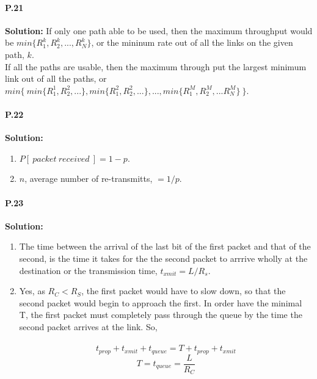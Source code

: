 \documentclass[12pt]{article}
\begin{document}
\paragraph{P.21\\}                                                                                                                                                
\textbf{Solution:}
If only one path able to be used, then the maximum throughput would be $min\{ R^k_1, R^k_2,...,R^k_N\}$, or the mininum rate out of all the links on the given path, $k$.\\If all the paths are usable, then the maximum through put the largest minimum link out of all the paths, or $min\{\ min\{R^1_1, R^2_2,...\}, min\{R^2_1, R^2_2,...\},...,min\{R^M_1, R^M_2,...R^M_N\}\ \}$. 


\paragraph{P.22\\}                                                                                                                                                     
\textbf{Solution:}
\begin{enumerate}[label = \alph*)]
\item $P[ \ packet\ received\  ] = 1 - p$.
\item $n$, average number of re-transmitts, $ = 1/p$.
\end{enumerate}

                                                                                                          
\paragraph{P.23\\}                                                                                                                                                     
\textbf{Solution:}
\begin{enumerate}[label = \alph*) ]
\item The time between the arrival of the last bit of the first packet and that of the second, is the time it takes for the the second packet to arrrive wholly at the destination or the transmission time, $t_{xmit} = L/R_s$. 
\item Yes, as $R_C<R_S$, the first packet would have to slow down, so that the second packet would begin to approach the first. In order have the minimal T, the first packet must completely pass through the queue by the time the second packet arrives at the link. So,\\
\
$$t_{prop} + t_{xmit} + t_{queue} = T + t_{prop} + t_{xmit}$$
$$T = t_{queue} = \frac{L}{R_C}$$
\end{enumerate}
\end{document}
